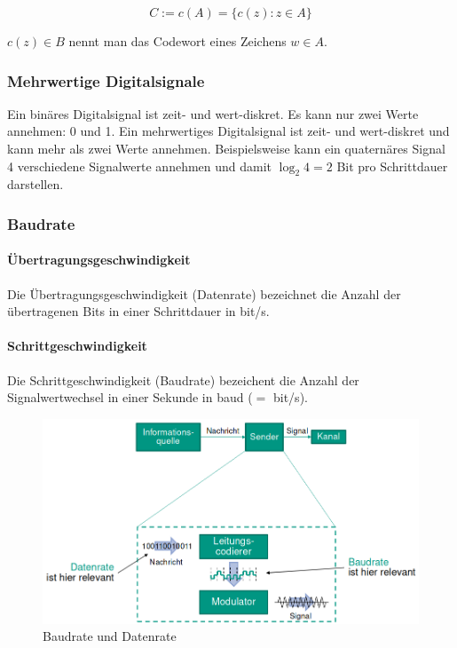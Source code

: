 \documentclass[a4paper, 14pt]{article}
\begin{document}
	\begin{equation*}
		C := c(A) = \{ c(z) : z \in A \}
	\end{equation*}

	$c(z) \in B$ nennt man das Codewort eines Zeichens $w \in A$.

	\subsubsection{Mehrwertige Digitalsignale}

	Ein binäres Digitalsignal ist zeit- und wert-diskret.
	Es kann nur zwei Werte annehmen: 0 und 1.
	Ein mehrwertiges Digitalsignal ist zeit- und wert-diskret und kann mehr als zwei Werte annehmen.
	Beispielsweise kann ein quaternäres Signal 4 verschiedene Signalwerte annehmen und damit $\log_2{}4 = 2$ Bit pro Schrittdauer darstellen.

	\subsubsection{Baudrate}

	\paragraph{Übertragungsgeschwindigkeit}
	
	Die Übertragungsgeschwindigkeit (Datenrate) bezeichnet die Anzahl der übertragenen Bits in einer Schrittdauer in bit/s.

	\paragraph{Schrittgeschwindigkeit}

	Die Schrittgeschwindigkeit (Baudrate) bezeichent die Anzahl der Signalwertwechsel in einer Sekunde in baud ($=$ bit/s).

	\begin{figure}
		\includegraphics[width=\textwidth]{images/03-baudrate-datarate.png}
		\caption{Baudrate und Datenrate}
	\end{figure}
\end{document}
